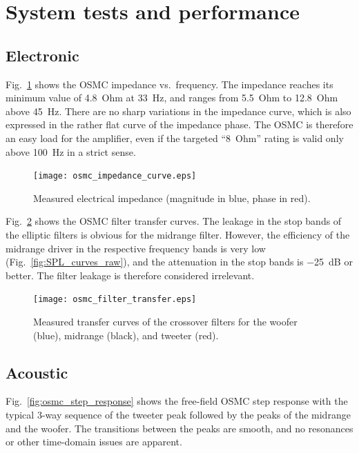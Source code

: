 \documentclass[12pt,a4paper]{article}
\providecommand{\figr}[1]{Fig.~\ref{fig:#1}}
\providecommand{\figlabel}[1]{\label{fig:#1}}
\begin{document}
\section{System tests and performance}

\subsection{Electronic}
\figr{osmc_impedance_curve} shows the OSMC impedance vs.\ frequency. The impedance reaches its minimum value of \SI{4.8}{Ohm} at \SI{33}{Hz}, and ranges from \SI{5.5}{Ohm} to \SI{12.8}{Ohm} above \SI{45}{Hz}. There are no sharp variations in the impedance curve, which is also expressed in the rather flat curve of the impedance phase. The OSMC is therefore an easy load for the amplifier, even if the targeted ``\SI{8}{Ohm}'' rating\cite{osmc_p904} is valid only above \SI{100}{Hz} in a strict sense.

\begin{figure}[tbp]
	\centering
	\texttt{[image: osmc\_impedance\_curve.eps]}
	\caption{Measured electrical impedance (magnitude in blue, phase in red).}
	\figlabel{osmc_impedance_curve}
\end{figure}

\figr{osmc_filter_transfer} shows the OSMC filter transfer curves. The leakage in the stop bands of the elliptic filters is obvious for the midrange filter. However, the efficiency of the midrange driver in the respective frequency bands is very low (\figr{SPL_curves_raw}), and the attenuation in the stop bands is \SI{-25}{dB} or better. The filter leakage is therefore considered irrelevant.

\begin{figure}[tpb]
	\centering
	\texttt{[image: osmc\_filter\_transfer.eps]}
	\caption{Measured transfer curves of the crossover filters for the woofer (blue), midrange (black), and tweeter (red).}
	\figlabel{osmc_filter_transfer}
\end{figure}


\subsection{Acoustic}
\figr{osmc_step_response} shows the free-field OSMC step response with the typical 3-way sequence of the tweeter peak followed by the peaks of the midrange and the woofer. The transitions between the peaks are smooth, and no resonances or other time-domain issues are apparent.
\end{document}
